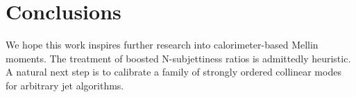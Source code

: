 \section{Conclusions}\label{sec:conclusions}

We hope this work inspires further research into calorimeter-based
Mellin moments. The treatment of boosted N-subjettiness ratios is
admittedly heuristic. A natural next step is to calibrate a family of
strongly ordered collinear modes for arbitrary jet algorithms.

